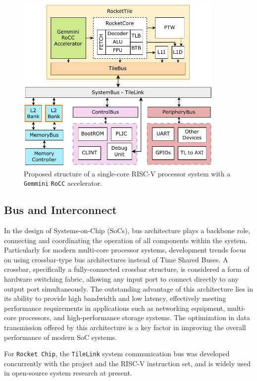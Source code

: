 \begin{figure}[h!]
    \centering
    \includegraphics[width=0.9\textwidth]{Images/RocketChip_Gemmini_Diagram.pdf}
    \caption{Proposed structure of a single-core RISC-V processor system with a \texttt{Gemmini} \texttt{RoCC} accelerator.}
    \label{fig:single_core_gemmini_system}
\end{figure}

\subsection{Bus and Interconnect}
\label{subsec:bus_interconnect}

In the design of Systems-on-Chip (SoCs), bus architecture plays a backbone role, connecting and coordinating the operation of all components within the system. Particularly for modern multi-core processor systems, development trends focus on using crossbar-type bus architectures instead of Time Shared Buses. A crossbar, specifically a fully-connected crossbar structure, is considered a form of hardware switching fabric, allowing any input port to connect directly to any output port simultaneously. The outstanding advantage of this architecture lies in its ability to provide high bandwidth and low latency, effectively meeting performance requirements in applications such as networking equipment, multi-core processors, and high-performance storage systems. The optimization in data transmission offered by this architecture is a key factor in improving the overall performance of modern SoC systems.

For \texttt{Rocket Chip}, the \texttt{TileLink} \cite{sifive2017tilelink} system communication bus was developed concurrently with the project and the RISC-V instruction set, and is widely used in open-source system research at present.


